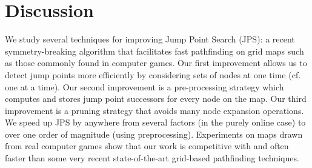 \section{Discussion}
\label{cha::jps2::discussion}
We study several techniques for improving Jump Point Search (JPS):
a recent symmetry-breaking algorithm that facilitates fast pathfinding 
on grid maps such as those commonly found in computer games.
Our first improvement allows us to detect jump points 
more efficiently by considering sets of nodes at one time (cf. one at a time). 
Our second improvement is a pre-processing strategy which computes and stores jump point
successors for every node on the map. Our third improvement is a 
pruning strategy that avoids many node expansion operations.
We speed up JPS by anywhere from several factors 
(in the purely online case) to over one order of magnitude (using preprocessing).
Experiments on maps drawn from real computer games show that our 
work is competitive with and often faster than some very recent 
state-of-the-art grid-based pathfinding techniques.
